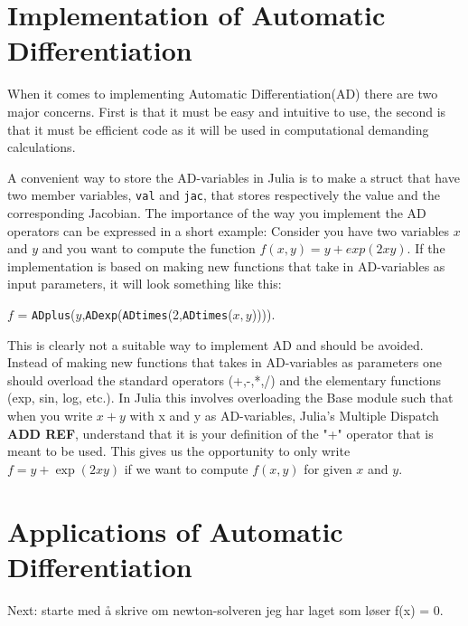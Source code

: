 \section{Implementation of Automatic Differentiation}
When it comes to implementing Automatic Differentiation(AD) there are two major concerns. First is that it must be easy and intuitive to use, the second is that it must be efficient code as it will be used in computational demanding calculations. 

A convenient way to store the AD-variables in Julia is to make a struct that have two member variables, \texttt{val} and \texttt{jac}, that stores respectively the value and the corresponding Jacobian. The importance of the way you implement the AD operators can be expressed in a short example: Consider you have two variables $x$ and $y$ and you want to compute the function $f(x,y) = y+exp(2xy)$. If the implementation is based on making new functions that take in AD-variables as input parameters, it will look something like this: 
\begin{center}
    $f$ = \texttt{ADplus}($y$,\texttt{ADexp}(\texttt{ADtimes}(2,\texttt{ADtimes}($x,y$)))).
\end{center}
This is clearly not a suitable way to implement AD and should be avoided. Instead of making new functions that takes in AD-variables as parameters one should overload the standard operators (+,-,*,/) and the elementary functions (exp, sin, log, etc.). In Julia this involves overloading the Base module such that when you write $x+y$ with x and y as AD-variables, Julia's Multiple Dispatch \textbf{ADD REF}, understand that it is your definition of the "+" operator that is meant to be used. This gives us the opportunity to only write $f = y+\exp(2xy)$ if we want to compute $f(x,y)$ for given $x$ and $y$. 

\section{Applications of Automatic Differentiation}
Next: starte med å skrive om newton-solveren jeg har laget som løser f(x) = 0.

